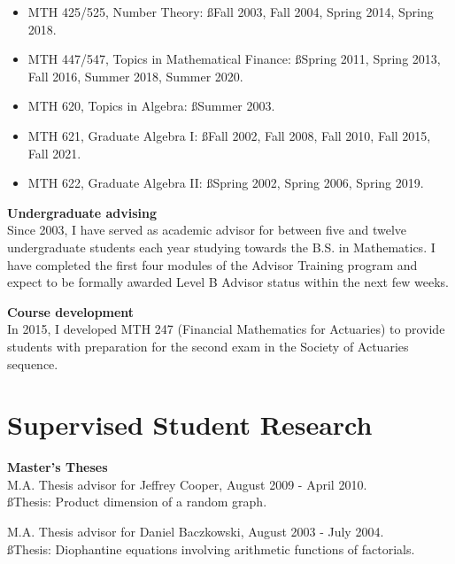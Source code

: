 \documentclass[overlapped,line,letterpaper]{res}
\begin{document}
\begin{resume}
\begin{itemize}
\item
MTH 425/525, Number Theory: {\ss Fall 2003, Fall 2004, Spring 2014, Spring 2018.}

\item

MTH 447/547, Topics in Mathematical Finance: {\ss Spring 2011, Spring 2013, Fall 2016, Summer 2018, Summer 2020.}

\item
MTH 620, Topics in Algebra: {\ss Summer 2003.}

\item
MTH 621, Graduate Algebra I: {\ss Fall 2002, Fall 2008, Fall 2010, Fall 2015, Fall 2021.}

\item
MTH 622, Graduate Algebra II: {\ss Spring 2002, Spring 2006, Spring 2019.}

\end{itemize}


{\bf Undergraduate advising} \\
Since 2003, I have served as academic advisor for between five and twelve undergraduate students each year studying towards the B.S. in Mathematics.  I have completed the first four modules of the Advisor Training program and expect to be formally awarded Level B Advisor status within the next few weeks.  

{\bf Course development} \\
In 2015, I developed MTH 247 (Financial Mathematics for Actuaries) to provide students with preparation for the second exam in the Society of Actuaries sequence.  


\large
\section{\bf Supervised Student Research}
\normalsize

\vspace{3 mm}

{\bf Master's Theses} \\ 
M.A. Thesis advisor for Jeffrey Cooper, August 2009 - April 2010. \\ 
{\ss Thesis:} Product dimension of a random graph.

M.A. Thesis advisor for Daniel Baczkowski, August 2003 - July 2004. \\
{\ss Thesis: } Diophantine equations involving arithmetic 
functions of factorials.




\end{resume}
\end{document}
